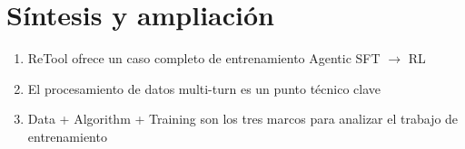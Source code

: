 \documentclass[a4paper]{article}
\begin{document}
\newpage
\section{Síntesis y ampliación}
\begin{enumerate}
  \item ReTool ofrece un caso completo de entrenamiento Agentic SFT $\to$ RL
  \item El procesamiento de datos multi-turn es un punto técnico clave
  \item Data + Algorithm + Training son los tres marcos para analizar el trabajo de entrenamiento
\end{enumerate}
\end{document}
